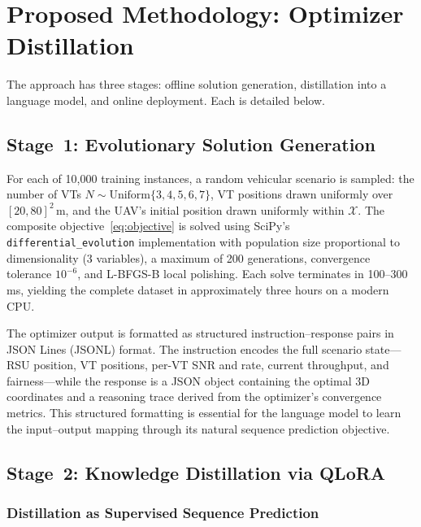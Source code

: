\documentclass[journal]{IEEEtran}
\begin{document}
\section{Proposed Methodology: Optimizer Distillation}
\label{sec:method}

The approach has three stages: offline solution generation, distillation into a language model, and online deployment. Each is detailed below.

\subsection{Stage~1: Evolutionary Solution Generation}

For each of 10{,}000 training instances, a random vehicular scenario is sampled: the number of VTs $N \sim \text{Uniform}\{3,4,5,6,7\}$, VT positions drawn uniformly over $[20,80]^2$\,m, and the UAV's initial position drawn uniformly within $\mathcal{X}$. The composite objective~\eqref{eq:objective} is solved using SciPy's \texttt{differential\_evolution} implementation \cite{storn1997} with population size proportional to dimensionality (3 variables), a maximum of 200 generations, convergence tolerance $10^{-6}$, and L-BFGS-B local polishing. Each solve terminates in 100--300\,ms, yielding the complete dataset in approximately three hours on a modern CPU.

The optimizer output is formatted as structured instruction--response pairs in JSON Lines (JSONL) format. The instruction encodes the full scenario state---RSU position, VT positions, per-VT SNR and rate, current throughput, and fairness---while the response is a JSON object containing the optimal 3D coordinates and a reasoning trace derived from the optimizer's convergence metrics. This structured formatting is essential for the language model to learn the input--output mapping through its natural sequence prediction objective.

\subsection{Stage~2: Knowledge Distillation via QLoRA}

\subsubsection{Distillation as Supervised Sequence Prediction}
\end{document}
